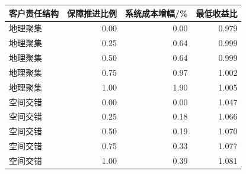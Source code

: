 \begin{tabular*}{0.86\linewidth}{@{\extracolsep{\fill}}lrrr@{}}
\toprule
客户责任结构 & 保障推进比例 & 系统成本增幅/\% & 最低收益比 \\
\midrule
地理聚集 & 0.00 & 0.00 & 0.979 \\
地理聚集 & 0.25 & 0.64 & 0.999 \\
地理聚集 & 0.50 & 0.64 & 0.999 \\
地理聚集 & 0.75 & 0.97 & 1.002 \\
地理聚集 & 1.00 & 1.90 & 1.005 \\
空间交错 & 0.00 & 0.00 & 1.047 \\
空间交错 & 0.25 & 0.18 & 1.066 \\
空间交错 & 0.50 & 0.19 & 1.070 \\
空间交错 & 0.75 & 0.33 & 1.077 \\
空间交错 & 1.00 & 0.39 & 1.081 \\
\bottomrule
\end{tabular*}
